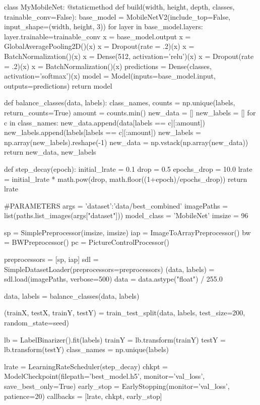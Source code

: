 \begin{python}
class MyMobileNet:
    @staticmethod
    def build(width, height, depth, classes, trainable_conv=False):
        base_model = MobileNetV2(include_top=False, input_shape=(width, height, 3))
        for layer in base_model.layers:
            layer.trainable=trainable_conv
        x = base_model.output
        x = GlobalAveragePooling2D()(x)
        x = Dropout(rate = .2)(x)
        x = BatchNormalization()(x)
        x = Dense(512, activation='relu')(x)
        x = Dropout(rate = .2)(x)
        x = BatchNormalization()(x)
        predictions = Dense(classes, activation='softmax')(x)
        model = Model(inputs=base_model.input, outputs=predictions)
        return model

def balance_classes(data, labels):
    class_names, counts = np.unique(labels, return_counts=True)
    amount = counts.min()
    new_data = []
    new_labels = []
    for c in class_names:
        new_data.append(data[labels == c][:amount])
        new_labels.append(labels[labels == c][:amount])
    new_labels = np.array(new_labels).reshape(-1)
    new_data = np.vstack(np.array(new_data))
    return new_data, new_labels

def step_decay(epoch):
    initial_lrate = 0.1
    drop = 0.5
    epochs_drop = 10.0
    lrate = initial_lrate * math.pow(drop, math.floor((1+epoch)/epochs_drop))
    return lrate

#PARAMETERS
args = {'dataset':'data/best_combined'}
imagePaths = list(paths.list_images(args["dataset"]))
model_class = 'MobileNet'
imsize = 96


sp = SimplePreprocessor(imsize, imsize)
iap = ImageToArrayPreprocessor()
bw = BWPreprocessor()
pc = PictureControlProcessor()

preprocessors = [sp, iap]
sdl = SimpleDatasetLoader(preprocessors=preprocessors)
(data, labels) = sdl.load(imagePaths, verbose=500)
data = data.astype("float") / 255.0

data, labels = balance_classes(data, labels)

(trainX, testX, trainY, testY) = train_test_split(data, labels, test_size=200, random_state=seed)

lb = LabelBinarizer().fit(labels)
trainY = lb.transform(trainY)
testY = lb.transform(testY)
class_names = np.unique(labels)

lrate = LearningRateScheduler(step_decay)
chkpt = ModelCheckpoint(filepath='best_model.h5', monitor='val_loss', save_best_only=True)
early_stop = EarlyStopping(monitor='val_loss', patience=20)
callbacks = [lrate,
            chkpt,
            early_stop]
            

\end{python}
